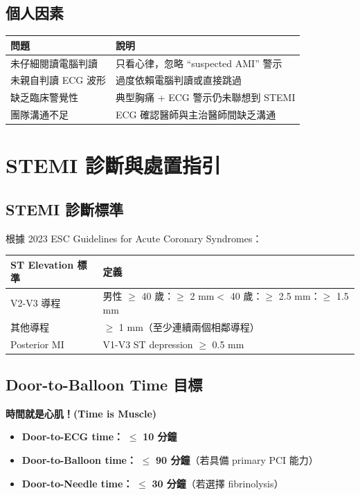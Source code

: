 \documentclass[12pt,a4paper]{article}
\begin{document}
\subsection{個人因素}

\begin{longtable}{p{5cm}p{9cm}}
\toprule
\textbf{問題} & \textbf{說明} \\
\midrule
\endhead
未仔細閱讀電腦判讀 & 只看心律，忽略 ``suspected AMI'' 警示 \\
\midrule
未親自判讀 ECG 波形 & 過度依賴電腦判讀或直接跳過 \\
\midrule
缺乏臨床警覺性 & 典型胸痛 + ECG 警示仍未聯想到 STEMI \\
\midrule
團隊溝通不足 & ECG 確認醫師與主治醫師間缺乏溝通 \\
\bottomrule
\end{longtable}

\newpage
\section{STEMI 診斷與處置指引}

\subsection{STEMI 診斷標準}

根據 2023 ESC Guidelines for Acute Coronary Syndromes：

\begin{longtable}{p{4cm}p{10cm}}
\toprule
\textbf{ST Elevation 標準} & \textbf{定義} \\
\midrule
\endhead
V2-V3 導程 & 男性 $\geq$ 40 歲：$\geq$ 2 mm $<$ 40 歲：$\geq$ 2.5 mm：$\geq$ 1.5 mm \\
\midrule
其他導程 & $\geq$ 1 mm（至少連續兩個相鄰導程） \\
\midrule
Posterior MI & V1-V3 ST depression $\geq$ 0.5 mm \\
\bottomrule
\end{longtable}

\subsection{Door-to-Balloon Time 目標}

\begin{importantbox}
\textbf{時間就是心肌！(Time is Muscle)}

\begin{itemize}[noitemsep]
\item \textbf{Door-to-ECG time：} $\leq$ \textbf{10 分鐘}
\item \textbf{Door-to-Balloon time：} $\leq$ \textbf{90 分鐘}（若具備 primary PCI 能力）
\item \textbf{Door-to-Needle time：} $\leq$ \textbf{30 分鐘}（若選擇 fibrinolysis）
\end{itemize}
\end{importantbox}
\end{document}
